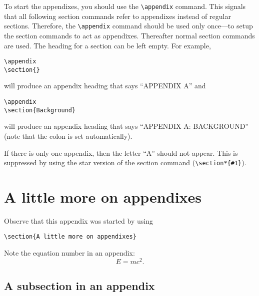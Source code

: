\documentclass[prb]{revtex4}
\begin{document}
To start the appendixes, you should use the \verb+\appendix+ command.
This signals that all following section commands refer to appendixes instead
of regular sections.
Therefore, the \verb+\appendix+ command should be used only once---to setup
the section commands to act as appendixes. Thereafter normal section commands
are used.
The heading for a section can be left empty. For example,
\begin{verbatim}
\appendix
\section{}
\end{verbatim}
will produce an appendix heading that says ``APPENDIX A'' and
\begin{verbatim}
\appendix
\section{Background}
\end{verbatim}
will produce an appendix heading that says ``APPENDIX A: BACKGROUND'' (note
that the colon is set automatically).

 If there is only
one appendix, then the letter ``A'' should not appear. This is suppressed by
using the star version of the section command (\verb+\section*{#1}+).

\section{A little more on appendixes}

Observe that this appendix was started by using
\begin{verbatim}
\section{A little more on appendixes}
\end{verbatim}

Note the equation number in an appendix:
\begin{equation} E=mc^2. \end{equation}

\subsection{A subsection in an appendix}
\label{app:subsec}
\end{document}
